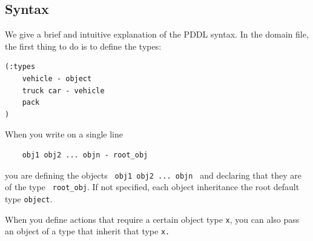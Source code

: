 \documentclass[10pt, letterpaper]{report}
\begin{document}
 \subsection{Syntax}
We give a brief and intuitive explanation of the PDDL syntax. In the domain file, the first thing to do is to define the types:\begin{lstlisting}
(:types
    vehicle - object 
    truck car - vehicle
    pack
)
\end{lstlisting}
When you write on a single line\begin{lstlisting}
    obj1 obj2 ... objn - root_obj 
\end{lstlisting}
you are defining the objects \texttt{ obj1 obj2 ... objn } and declaring that they are of the type \texttt{ root\_obj}. If not specified, each object inheritance the root default type \texttt{object}.

When you define actions that require a certain object type \texttt{x}, you can also pass an object of a type that inherit that type \texttt{x.}
\bigskip
\end{document}

